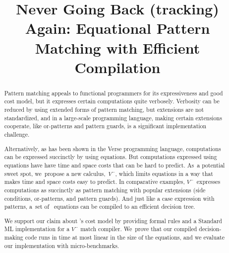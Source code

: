 \documentclass[runningheads]{llncs}
\begin{document}
%
\title{Never Going Back (tracking) Again: Equational Pattern Matching with Efficient Compilation}
%
%


%


%

%
\maketitle              %
%
\vspace{-0.25in}
\begin{abstract}
    Pattern matching appeals to functional programmers for its expressiveness
    and good cost model, but it expresses certain computations quite verbosely.
Verbosity can be reduced by using extended forms of pattern
    matching, but extensions are not standardized, and
in a large-scale programming
    language, 
 making certain extensions
     cooperate,
like or-patterns and pattern guards,
 is a significant implementation challenge.

    
    Alternatively,
as has been shown in the Verse programming
    language, computations can be expressed succinctly
    by using equations.
But computations expressed using equations have have time and space costs that can
    be hard to predict. 
As~a potential sweet spot, we~propose a new
    calculus,~\ensuremath{V^{-}}, which limits equations in a way that
    makes time and space costs easy to predict. %
In comparative examples,
    \ensuremath{V^{-}}~expresses computations as succinctly as pattern matching
    with popular extensions (side conditions, or-patterns, and pattern
    guards).
    And just like a case expression with patterns,
    a~set of \VMinus\ equations can be compiled to an efficient decision
    tree. %

    We support our claim about \VMinus's cost model by providing
    formal rules and a Standard ML implementation for a \ensuremath{V^{-}}
    match compiler.
    We~prove that our 
    compiled decision-making code runs in time at most linear in the size of the equations,
    and we evaluate our implementation with micro-benchmarks.

\end{abstract}
\end{document}
